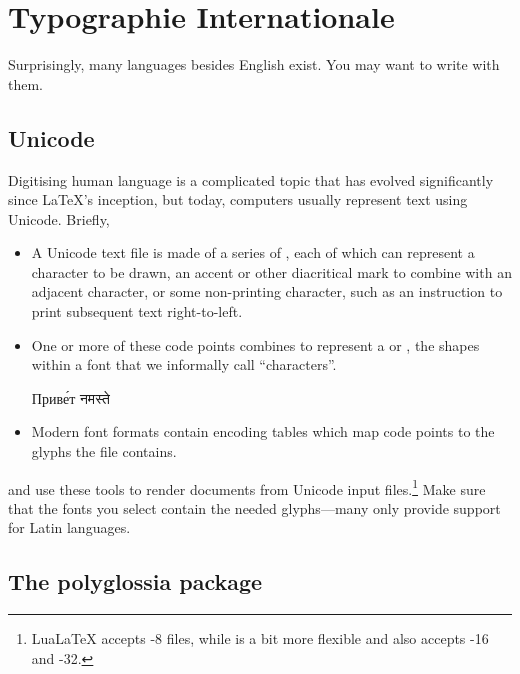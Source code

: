 \chapter{Typographie Internationale}
\label{i18n}

Surprisingly, many languages besides English exist.
You may want to write with them.

\section{Unicode}

Digitising human language is a complicated topic that has evolved significantly
since \LaTeX's inception, but today,
computers usually represent text using Unicode. Briefly,
\begin{itemize}
\item A Unicode text file is made of a series of ,
    each of which can represent a character to be drawn,
    an accent or other diacritical mark to combine with an adjacent character,
    or some non-printing character,
    such as an instruction to print subsequent text right-to-left.
\item One or more of these code points combines to represent a
     or ,
    the shapes within a font that we informally call ``characters''\quotekern.
\begin{centerfigure}
\large%
%
Приве́т
\quad{}%
नमस्ते
\end{centerfigure}
\item Modern font formats contain encoding tables
    which map code points to the glyphs the file contains.
\end{itemize}
\LuaLaTeX{} and \XeLaTeX{} use these tools to render documents
from Unicode input
files.\punckern\footnote{LuaLaTeX accepts \mbox{-8} files,
while \XeLaTeX{} is a bit more flexible and also
accepts \mbox{-16} and
\mbox{-32}.}
Make sure that the fonts you select contain the needed glyphs---many
only provide support for Latin languages.

\section{The polyglossia package}

